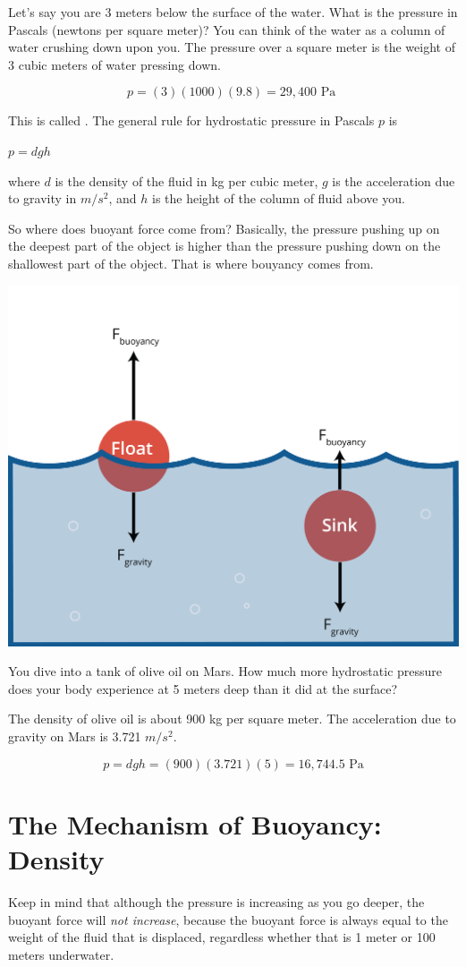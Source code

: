 Let's say you are 3 meters below the surface of the water. What is the
pressure in Pascals (newtons per square meter)? You can think of the
water as a column of water crushing down upon you. The pressure over
a square meter is the weight of 3 cubic meters of water pressing down.

$$p = (3)(1000)(9.8) = 29,400 \text{ Pa }$$

This is called . The general rule for
hydrostatic pressure in Pascals $p$ is

$p = d g h$

where $d$ is the density of the fluid
in kg per cubic meter, $g$ is the acceleration due to gravity in
$m/s^2$, and $h$ is the height of the column of fluid above you.

So where does buoyant force come from? Basically, the pressure pushing up on the
deepest part of the object is higher than the pressure pushing down on
the shallowest part of the object. That is where bouyancy comes from.

\includegraphics[width=.6\textwidth]{buoyancy.png}

\begin{Exercise}[title={Hydrostatic Pressure}, label=mars_pressure]

  You dive into a tank of olive oil on Mars. How much more
  hydrostatic pressure does your body experience at 5 meters deep than
  it did at the surface?

  The density of olive oil is about 900 kg per square meter. The
  acceleration due to gravity on Mars is 3.721 $m/s^2$.

\end{Exercise}
\begin{Answer}[ref=mars_pressure]
$$p = d g h = (900)(3.721)(5) = 16,744.5 \text{ Pa}$$
\end{Answer}

\section{The Mechanism of Buoyancy: Density}
Keep in mind that although the pressure is increasing as you go deeper, the
buoyant force will \emph{not increase}, because the buoyant force is always equal
to the weight of the fluid that is displaced, regardless whether that is 1
meter or 100 meters underwater.

